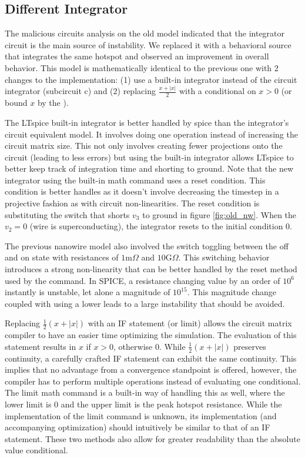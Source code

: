 \subsection{Different Integrator}

The malicious circuits analysis on the old model indicated
that the integrator circuit is the main source of instability. 
We replaced it with a behavioral source that integrates the same hotspot
and observed an improvement in overall behavior.
This model is mathematically identical to the previous one with 2 changes
to the implementation: (1) use a built-in integrator instead of the circuit
integrator (subcircuit c) and (2) replacing $\frac{x+|x|}{2}$ with a conditional
on $x>0$ (or bound $x$ by the ).

The LTspice built-in integrator is better handled
by spice than the integrator's circuit equivalent model.
It involves doing one operation instead of increasing the circuit
matrix size. 
This not only involves creating fewer projections onto the circuit (leading to less errors)
but using the built-in integrator allows LTspice to better keep track of integration
time and shorting to ground. Note that the new integrator using the built-in
 math command uses a reset condition. This condition is better handles as it
doesn't involve decreasing the timestep in a projective fashion as with circuit
non-linearities. The reset condition is substituting the switch that shorts $v_3$
to ground in figure \ref{fig:old_nw}. When the $v_2=0$ (wire is superconducting),
the integrator resets to the initial condition $0$.

The previous nanowire model also involved the switch toggling between the off and on
state with resistances of $1$m$\Omega$ and $10$G$\Omega$. This switching behavior
introduces a strong non-linearity that can be better handled by the reset method
used by the  command. In SPICE, a resistance changing value by an order of
$10^6$ instantly is unstable, let alone a magnitude of $10^{15}$. This magnitude
change coupled with using a lower  leads to a large instability that
should be avoided.

Replacing $\frac{1}{2}\left(x+|x|\right)$ with an IF statement (or limit) allows the circuit matrix compiler to
have an easier time optimizing the simulation. The evaluation of this statement results in $x$ if $x>0$, otherwise
$0$.
While $\frac{1}{2}\left(x+|x|\right)$ preserves continuity,
a carefully crafted IF statement can exhibit the same continuity. This implies that no advantage from a
convergence standpoint is offered, however, the compiler has to perform multiple operations instead of
evaluating one conditional. The limit math command is a built-in way of handling this as well, where the
lower limit is $0$ and the upper limit is the peak hotspot resistance. While the implementation of the limit
command is unknown, its implementation (and accompanying optimization) should intuitively be similar to that
of an IF statement. These two methods also allow for greater readability than the absolute value conditional.


